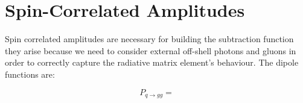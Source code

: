 \documentclass[a4paper]{article}
\begin{document}
\section{Spin-Correlated Amplitudes}
Spin correlated amplitudes are necessary for building the subtraction function they arise because 
we need to consider external off-shell photons and gluons in order to correctly capture the 
radiative matrix element's behaviour. The dipole functions are:

\begin{equation}
 P_{q\rightarrow gg} = 
\end{equation}
\end{document}
